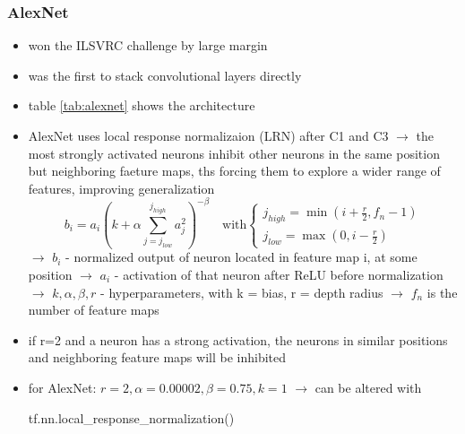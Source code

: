 \documentclass[12pt,a4paper]{article}
\begin{document}
\subsubsection{AlexNet} %
\label{ssub:alexnet}
\begin{itemize}
  \item won the ILSVRC challenge by large margin
  \item was the first to stack convolutional layers directly
  \item table \ref{tab:alexnet} shows the architecture
  \item AlexNet uses local response normalizaion (LRN) after C1 and C3 
  \newline \indent $\longrightarrow$ the most strongly activated neurons inhibit other neurons in the same position but neighboring faeture maps, ths forcing them to explore a wider range of features, improving generalization
  \begin{equation}
    b_i = a_i (k + \alpha \sum^{j_{high}}_{j = j_{low}} a_j^2)^{-\beta} \quad \text{with} 
    \begin{cases}
      j_{high} = \min(i + \frac{r}{2}, f_n -1)\\
      j_{low}  = \max(0, i - \frac{r}{2})
    \end{cases}
  \end{equation}
  \newline \indent $\longrightarrow$ $b_i$ - normalized output of neuron located in feature map i, at some position
  \newline \indent $\longrightarrow$ $a_i$ - activation of that neuron after ReLU before normalization
  \newline \indent $\longrightarrow$ $k, \alpha, \beta, r$ - hyperparameters, with k = bias, r = depth radius
  \newline \indent $\longrightarrow$ $f_n$ is the number of feature maps
  \item if r=2 and a neuron has a strong activation, the neurons in similar positions and neighboring feature maps will be inhibited
  \item for AlexNet: $r = 2, \alpha = 0.00002, \beta = 0.75, k=1$
  \newline \indent $\longrightarrow$ can be altered with 
  \begin{python}
    tf.nn.local_response_normalization()
  \end{python}
\end{itemize}
\end{document}
